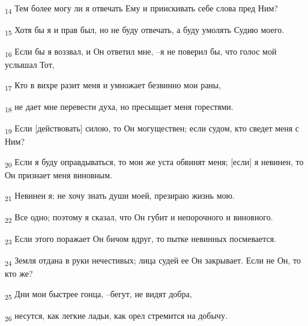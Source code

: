 \begin{tcolorbox}
\textsubscript{14} Тем более могу ли я отвечать Ему и приискивать себе слова пред Ним?
\end{tcolorbox}
\begin{tcolorbox}
\textsubscript{15} Хотя бы я и прав был, но не буду отвечать, а буду умолять Судию моего.
\end{tcolorbox}
\begin{tcolorbox}
\textsubscript{16} Если бы я воззвал, и Он ответил мне, --я не поверил бы, что голос мой услышал Тот,
\end{tcolorbox}
\begin{tcolorbox}
\textsubscript{17} Кто в вихре разит меня и умножает безвинно мои раны,
\end{tcolorbox}
\begin{tcolorbox}
\textsubscript{18} не дает мне перевести духа, но пресыщает меня горестями.
\end{tcolorbox}
\begin{tcolorbox}
\textsubscript{19} Если [действовать] силою, то Он могуществен; если судом, кто сведет меня с Ним?
\end{tcolorbox}
\begin{tcolorbox}
\textsubscript{20} Если я буду оправдываться, то мои же уста обвинят меня; [если] я невинен, то Он признает меня виновным.
\end{tcolorbox}
\begin{tcolorbox}
\textsubscript{21} Невинен я; не хочу знать души моей, презираю жизнь мою.
\end{tcolorbox}
\begin{tcolorbox}
\textsubscript{22} Все одно; поэтому я сказал, что Он губит и непорочного и виновного.
\end{tcolorbox}
\begin{tcolorbox}
\textsubscript{23} Если этого поражает Он бичом вдруг, то пытке невинных посмевается.
\end{tcolorbox}
\begin{tcolorbox}
\textsubscript{24} Земля отдана в руки нечестивых; лица судей ее Он закрывает. Если не Он, то кто же?
\end{tcolorbox}
\begin{tcolorbox}
\textsubscript{25} Дни мои быстрее гонца, --бегут, не видят добра,
\end{tcolorbox}
\begin{tcolorbox}
\textsubscript{26} несутся, как легкие ладьи, как орел стремится на добычу.
\end{tcolorbox}
